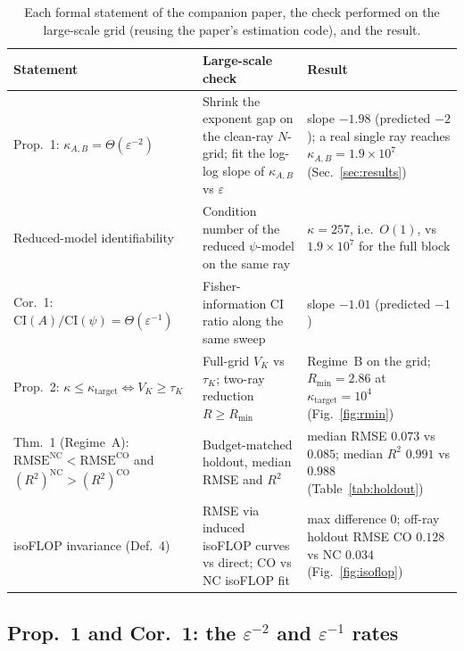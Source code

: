 \documentclass[11pt]{article}
\newcommand{\kAB}{\kappa_{A,B}}
\begin{document}
\begin{table}[t]
\centering
\small
\caption{Each formal statement of the companion paper, the check performed on the large-scale grid
(reusing the paper's estimation code), and the result.}
\label{tab:formal}
\begin{tabular}{@{}p{3.3cm}p{5.0cm}p{4.7cm}@{}}
\toprule
\textbf{Statement} & \textbf{Large-scale check} & \textbf{Result}\\
\midrule
Prop.~1: $\kAB=\Theta(\varepsilon^{-2})$ &
Shrink the exponent gap on the clean-ray $N$-grid; fit the log-log slope of $\kAB$ vs
$\varepsilon$ &
slope $-1.98$ (predicted $-2$); a real single ray reaches $\kAB=1.9\times10^{7}$
(Sec.~\ref{sec:results})\\[2pt]
Reduced-model identifiability &
Condition number of the reduced $\psi$-model on the same ray &
$\kappa=257$, i.e.\ $O(1)$, vs $1.9\times10^{7}$ for the full block\\[2pt]
Cor.~1: $\mathrm{CI}(A)/\mathrm{CI}(\psi)=\Theta(\varepsilon^{-1})$ &
Fisher-information CI ratio along the same sweep &
slope $-1.01$ (predicted $-1$)\\[2pt]
Prop.~2: $\kappa\le\kappa_{\mathrm{target}}\!\iff\!V_K\ge\tau_K$ &
Full-grid $V_K$ vs $\tau_K$; two-ray reduction $R\ge R_{\min}$ &
Regime~B on the grid; $R_{\min}=2.86$ at $\kappa_{\mathrm{target}}{=}10^{4}$
(Fig.~\ref{fig:rmin})\\[2pt]
Thm.~1 (Regime~A): $\mathrm{RMSE}^{\mathrm{NC}}\!<\!\mathrm{RMSE}^{\mathrm{CO}}$ and
$(R^2)^{\mathrm{NC}}\!>\!(R^2)^{\mathrm{CO}}$ &
Budget-matched holdout, median RMSE and $R^2$ &
median RMSE $0.073$ vs $0.085$; median $R^2$ $0.991$ vs $0.988$ (Table~\ref{tab:holdout})\\[2pt]
isoFLOP invariance (Def.~4) &
RMSE via induced isoFLOP curves vs direct; CO vs NC isoFLOP fit &
max difference $0$; off-ray holdout RMSE CO $0.128$ vs NC $0.034$ (Fig.~\ref{fig:isoflop})\\
\bottomrule
\end{tabular}
\end{table}

\subsection{Prop.~1 and Cor.~1: the $\varepsilon^{-2}$ and $\varepsilon^{-1}$ rates}
\end{document}
